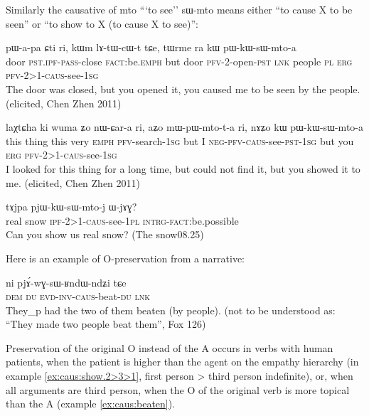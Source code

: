 \documentclass[oldfontcommands,oneside,a4paper,11pt]{article}
\newcommand{\ipa}[1]{{\phon \mbox{#1}}} %
\newcommand{\sg}{\textsc{sg}}
\newcommand{\pl}{\textsc{pl}}
\newcommand{\wav}[1]{}%
\newcommand{\pfv}{\textsc{pfv}}
\newcommand{\caus}{\textsc{caus}}
\newcommand{\lnk}{\textsc{lnk}}
\newcommand{\dem}{\textsc{dem}}
\newcommand{\du}{\textsc{du}}
\newcommand{\erg}{\textsc{erg}}
\newcommand{\emphat}{\textsc{emph}}
\newcommand{\evd}{\textsc{evd}}
\newcommand{\intrg}{\textsc{intrg}}
\newcommand{\inv}{\textsc{inv}}
\newcommand{\ipf}{\textsc{ipf}}
\newcommand{\negat}{\textsc{neg}}
\newcommand{\fact}{\textsc{fact}}
\newcommand{\pass}{\textsc{pass}}
\newcommand{\pst}{\textsc{pst}}
\begin{document}
Similarly the causative of \ipa{mto} ```to see'' \ipa{sɯ-mto} means either ``to cause X to be seen'' or ``to show to X (to cause X to see)'':

\begin{exe} 
\ex \label{ex:caus:show.2>3>1}
\gll  \ipa{kɯm} 	\ipa{pɯ-a-pa} 	\ipa{ɕti} 	\ipa{ri,} 	\ipa{kɯm} 	\ipa{lɤ-tɯ-cɯ-t} 	\ipa{tɕe,} 	\ipa{tɯrme} 	\ipa{ra} 	\ipa{kɯ} 	\ipa{pɯ-kɯ-sɯ-mto-a}  \\
door \pst{}.\ipf{}-\pass{}-close \fact{}:be.\emphat{} but door \pfv{}-2-open-\pst{} \lnk{} people \pl{} \erg{}  \pfv{}-2>1-\caus{}-see-1\sg{}  \\
 \glt The door was closed, but you opened it, you caused me to be seen by the people. (elicited, Chen Zhen 2011) \wav{8_pWkWsWmtoa} 
\end{exe} 


\begin{exe}
\ex
\gll \ipa{kɯki} 	\ipa{laχtɕha} 	\ipa{ki} 	\ipa{wuma} 	\ipa{ʑo} 	\ipa{nɯ-ɕar-a} 	\ipa{ri,} 	\ipa{aʑo} 	\ipa{mɯ-pɯ-mto-t-a} 	\ipa{ri,} 	\ipa{nɤʑo} 	\ipa{kɯ} 	\ipa{pɯ-kɯ-sɯ-mto-a}   \\
this thing this very \emphat{} \pfv{}-search-1\sg{} but I \negat{}-\pfv{}-\caus{}-see-\pst{}-1\sg{} but you \erg{}  \pfv{}-2>1-\caus{}-see-1\sg{} \\
 \glt I looked for this thing for a long time, but could not find it, but you showed it to me. (elicited, Chen Zhen 2011)
\end{exe} 

\begin{exe}
\ex
\gll   \ipa{koŋla} 	\ipa{tɤjpa} 	\ipa{pjɯ-kɯ-sɯ-mto-j} 	\ipa{ɯ-jɤɣ?}   \\
real snow \ipf{}-2>1-\caus{}-see-1\pl{} \intrg{}-\fact{}:be.possible  \\
 \glt Can you show us real snow? (The snow08.25)
\end{exe} 


Here is an example of O-preservation from a narrative:
\begin{exe} 
\ex \label{ex:caus:beaten}
\gll  \ipa{nɯnɯ} 	\ipa{ni} 	\ipa{pjɤ́-wɣ-sɯ-ʁndɯ-ndʑi} 	\ipa{tɕe}  \\
\dem{} \du{} \evd{}-\inv{}-\caus{}-beat-\du{} \lnk{} \\
\glt They_p had the two of them beaten (by people). (not to be understood as: ``They made two people beat them'', Fox 126)
\end{exe} 
Preservation of the original O   instead of the A occurs in verbs with  human patients, when the patient is higher than the agent on the empathy hierarchy (in example \ref{ex:caus:show.2>3>1}, first person > third person indefinite), or, when all arguments are third person, when the O of the original verb is more topical than the A (example \ref{ex:caus:beaten}).
\end{document}
